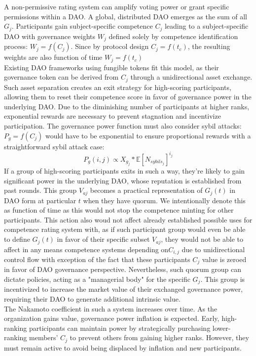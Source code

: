\documentclass{article}
\begin{document}
\begin{CJK}{UTF8}{gbsn}
\begin{multicols}{2}
        A non-permissive rating system can amplify voting power or grant specific permissions within a DAO. A global, distributed DAO emerges as the sum of all $G_j$. Participants gain subject-specific competence $C_{j}$ leading to a subject-specific DAO with governance weights $W_j$ defined solely by competence identification process: $W_j = f(C_{j})$. Since by protocol design $C_j=f(t_c)$, the resulting weights are also function of time $W_j=f(t_c)$\\
        Existing DAO frameworks using fungible tokens fit this model, as their governance token can be derived from $C_{j}$ through a unidirectional asset exchange. Such asset separation creates an exit strategy for high-scoring participants, allowing them to reset their competence score in favor of governance power in the underlying DAO.
        Due to the diminishing number of participants at higher ranks, exponential rewards are necessary to prevent stagnation and incentivize participation. The governance power function must also consider sybil attacks: $P_g = f(C_{j})$ would have to be exponential to ensure proportional rewards with a straightforward sybil attack case: $$P_g(i,j) \propto  X_{g_j}*\mathbb{E}[N_{sybils_j}]^{i_j}$$
        If a group of high-scoring participants exits in such a way, they're likely to gain significant power in the underlying DAO, whose reputation is established from past rounds. This group $V_{aj}$ becomes a practical representation of $G_j(t)$ in DAO form at particular $t$ when they have quorum. We intentionally denote this as function of time as this would not stop the competence minting for other participants. This action also woud not affect already established possible uses for competence rating system with, as if such participant group would even be able to define $G_j(t)$ in favor of their specific subset $V_{aj}$, they would not be able to affect in any means competence systems depending on$C _{i,j}$ due to unidirectional control flow with exception of the fact that these participants $C_{j}$ value is zeroed in favor of DAO governance perspective.
        Nevertheless, such quorum group can dictate policies, acting as a "managerial body" for the specific $G_j$. This group is incentivized to increase the market value of their exchanged governance power, requiring their DAO to generate additional intrinsic value. \\
        The Nakamoto coefficient in such a system increases over time. As the organization gains value, governance power inflation is expected. Early, high-ranking participants can maintain power by strategically purchasing lower-ranking members' $C_{j}$ to prevent others from gaining higher ranks. However, they must remain active to avoid being displaced by inflation and new participants.


\end{multicols}
\end{CJK}
\end{document}
